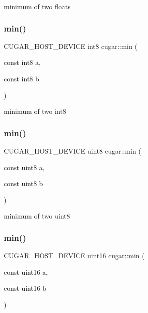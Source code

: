 minimum of two floats \mbox{\label{group___basic_gac9bd069f8fb579f27655344e2a8eaafe}} 
\subsubsection{\texorpdfstring{min()}{min()}\hspace{0.1cm}{\footnotesize\ttfamily [2/8]}}
{\footnotesize\ttfamily C\+U\+G\+A\+R\+\_\+\+H\+O\+S\+T\+\_\+\+D\+E\+V\+I\+CE int8 cugar\+::min (\begin{DoxyParamCaption}\item[{const int8}]{a,  }\item[{const int8}]{b }\end{DoxyParamCaption})\hspace{0.3cm}{\ttfamily [inline]}}

minimum of two int8 \mbox{\label{group___basic_ga07e60716a77447bddef733b3c77838a7}} 
\subsubsection{\texorpdfstring{min()}{min()}\hspace{0.1cm}{\footnotesize\ttfamily [3/8]}}
{\footnotesize\ttfamily C\+U\+G\+A\+R\+\_\+\+H\+O\+S\+T\+\_\+\+D\+E\+V\+I\+CE uint8 cugar\+::min (\begin{DoxyParamCaption}\item[{const uint8}]{a,  }\item[{const uint8}]{b }\end{DoxyParamCaption})\hspace{0.3cm}{\ttfamily [inline]}}

minimum of two uint8 \mbox{\label{group___basic_gadac4763807d3e84119b991def668b96a}} 
\subsubsection{\texorpdfstring{min()}{min()}\hspace{0.1cm}{\footnotesize\ttfamily [4/8]}}
{\footnotesize\ttfamily C\+U\+G\+A\+R\+\_\+\+H\+O\+S\+T\+\_\+\+D\+E\+V\+I\+CE uint16 cugar\+::min (\begin{DoxyParamCaption}\item[{const uint16}]{a,  }\item[{const uint16}]{b }\end{DoxyParamCaption})\hspace{0.3cm}{\ttfamily [inline]}}

